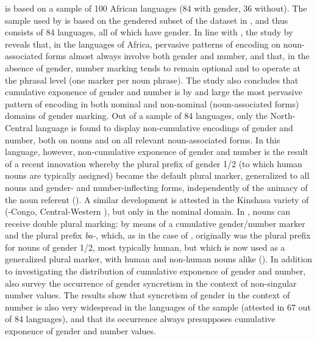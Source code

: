 \documentclass[output=collectionpaper]{langsci/langscibook}
\begin{document}
\cite{DiGarbo2014} is based on a sample of 100 African languages (84 with gender, 36 without). The sample used by \cite{DiGarbo2018} is based on the gendered subset of the dataset in \cite{DiGarbo2014}, and thus consists of 84 languages, all of which have gender. In line with \cite{Creissels2008}, the study by \cite[134]{DiGarbo2014} reveals that, in the languages of Africa, pervasive patterns of encoding on noun-associated forms almost always involve both gender and number, and that, in the absence of gender, number marking tends to remain optional and to operate at the phrasal level (one marker per noun phrase). The study also concludes that cumulative exponence of gender and number is by and large the most pervasive pattern of encoding in both nominal and non-nominal (noun-associated forms) domains of gender marking. Out of a sample of 84 languages, only the North-Central  language  is found to display non-cumulative encodings of gender and number, both on nouns and on all relevant noun-associated forms. In this language, however, non-cumulative exponence of gender and number is the result of a recent innovation whereby the plural prefix of gender 1/2 (to which human nouns are typically assigned) became the default plural marker, generalized to all nouns and gender- and number-inflecting forms, independently of the animacy of the noun referent (\citealt[187]{DiGarbo2018a}). A similar development is attested in the Kinshasa variety of  (-Congo, Central-Western ), but only in the nominal domain. In , nouns can receive double plural marking: by means of a cumulative gender/number marker and the plural prefix \textit{ba-}, which, as in the case of , originally was the plural prefix for nouns of gender 1/2, most typically human, but which is now used as a generalized plural marker, with human and non-human nouns alike (\citealt[188]{DiGarbo2018a}). In addition to investigating the distribution of cumulative exponence of gender and number, \cite{DiGarbo2018a} also survey the occurrence of gender syncretism in the context of non-singular number values. The results show that syncretism of gender in the context of number is also very widespread in the languages of the sample (attested in 67 out of 84 languages), and that its occurrence always presupposes cumulative exponence of gender and number values.
\end{document}

